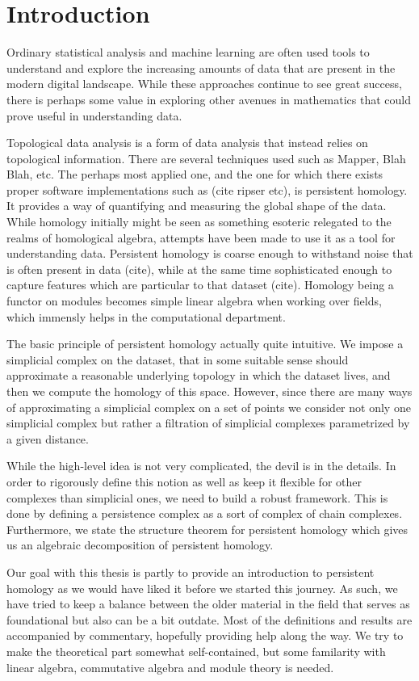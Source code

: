\chapter{Introduction}
Ordinary statistical analysis and machine learning are often used tools to understand and explore the increasing amounts of data that are present in the modern digital landscape. While these approaches continue to see great success, there is perhaps some value in exploring other avenues in mathematics that could prove useful in understanding data.

Topological data analysis is a form of data analysis that instead relies on topological information. There are several techniques used such as Mapper, Blah Blah, etc. The perhaps most applied one, and the one for which there exists proper software implementations such as (cite ripser etc), is persistent homology. It provides a way of quantifying and measuring the global shape of the data. While homology initially might be seen as something esoteric relegated to the realms of homological algebra, attempts have been made to use it as a tool for understanding data. Persistent homology is coarse enough to withstand noise that is often present in data (cite), while at the same time sophisticated enough to capture features which are particular to that dataset (cite). Homology being a functor on modules becomes simple linear algebra when working over fields, which immensly helps in the computational department.

The basic principle of persistent homology actually quite intuitive. We impose a simplicial complex on the dataset, that in some suitable sense should approximate a reasonable underlying topology in which the dataset lives, and then we compute the homology of this space. However, since there are many ways of approximating a simplicial complex on a set of points we consider not only one simplicial complex but rather a filtration of simplicial complexes parametrized by a given distance.

While the high-level idea is not very complicated, the devil is in the details. In order to rigorously define this notion as well as keep it flexible for other complexes than simplicial ones, we need to build a robust framework. This is done by defining a persistence complex as a sort of complex of chain complexes. Furthermore, we state the structure theorem for persistent homology which gives us an algebraic decomposition of persistent homology.

Our goal with this thesis is partly to provide an introduction to persistent homology as we would have liked it before we started this journey. As such, we have tried to keep a balance between the older material in the field that serves as foundational but also can be a bit outdate. Most of the definitions and results are accompanied by commentary, hopefully providing help along the way. We try to make the theoretical part somewhat self-contained, but some familarity with linear algebra, commutative algebra and module theory is needed.

